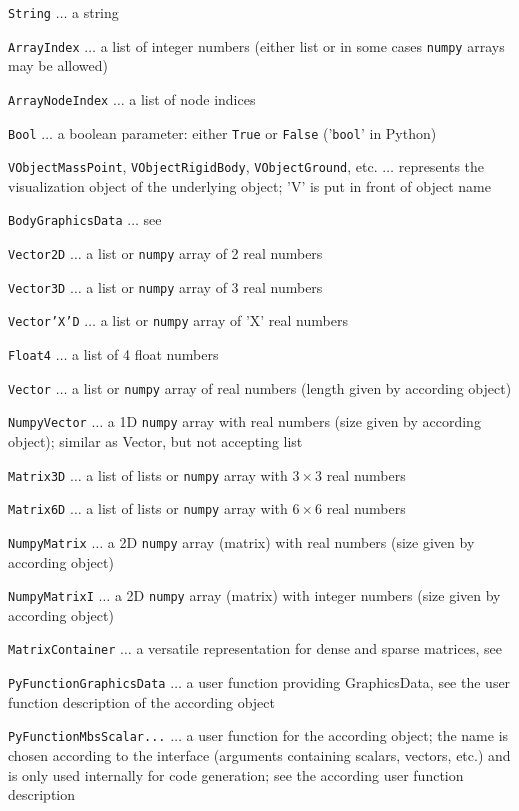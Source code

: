   \item \texttt{String} $\ldots$ a string
  \item \texttt{ArrayIndex} $\ldots$ a list of integer numbers (either list or in some cases \texttt{numpy} arrays may be allowed)
  \item \texttt{ArrayNodeIndex} $\ldots$ a list of node indices
  \item \texttt{Bool} $\ldots$ a boolean parameter: either \texttt{True} or \texttt{False} ('\texttt{bool}' in Python)
  \item \texttt{VObjectMassPoint}, \texttt{VObjectRigidBody}, \texttt{VObjectGround}, etc.  $\ldots$ represents the visualization object of the underlying object; 'V' is put in front of object name
  \item \texttt{BodyGraphicsData} $\ldots$ see 
%
  \item \texttt{Vector2D} $\ldots$ a list or \texttt{numpy} array of 2 real numbers
  \item \texttt{Vector3D} $\ldots$ a list or \texttt{numpy} array of 3 real numbers
  \item \texttt{Vector'X'D} $\ldots$ a list or \texttt{numpy} array of 'X' real numbers
  \item \texttt{Float4} $\ldots$ a list of 4 float numbers
  \item \texttt{Vector} $\ldots$ a list or \texttt{numpy} array of real numbers (length given by according object)
  \item \texttt{NumpyVector} $\ldots$ a 1D \texttt{numpy} array with real numbers (size given by according object); similar as Vector, but not accepting list
%
  \item \texttt{Matrix3D} $\ldots$ a list of lists or \texttt{numpy} array with $3 \times 3$ real numbers
  \item \texttt{Matrix6D} $\ldots$ a list of lists or \texttt{numpy} array with $6 \times 6$ real numbers
  \item \texttt{NumpyMatrix} $\ldots$ a 2D \texttt{numpy} array (matrix) with real numbers (size given by according object)
  \item \texttt{NumpyMatrixI} $\ldots$ a 2D \texttt{numpy} array (matrix) with integer numbers (size given by according object)
  \item \texttt{MatrixContainer} $\ldots$ a versatile representation for dense and sparse matrices, see 
%
  \item \texttt{PyFunctionGraphicsData} $\ldots$ a user function providing GraphicsData, see the user function description of the according object
  \item \texttt{PyFunctionMbsScalar...} $\ldots$ a user function for the according object; the name is chosen according to the interface (arguments containing scalars, vectors, etc.) and is only used internally for code generation; see the according user function description
\ei

